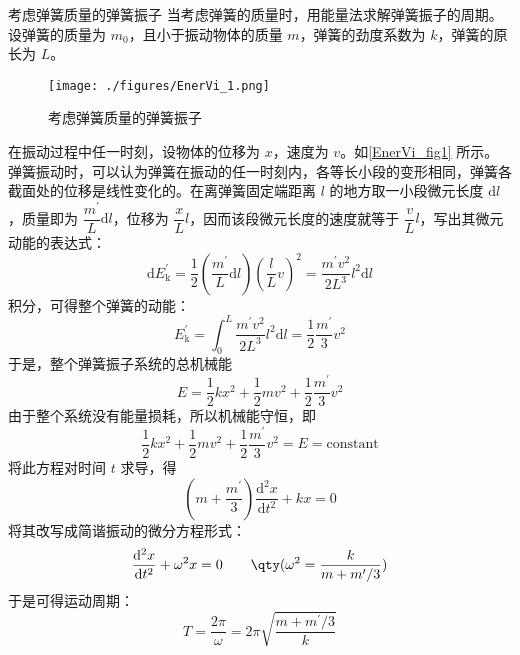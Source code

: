\begin{example}{考虑弹簧质量的弹簧振子}
当考虑弹簧的质量时，用能量法求解弹簧振子的周期。设弹簧的质量为 $m_0$，且小于振动物体的质量 $m$，弹簧的劲度系数为 $k$，弹簧的原长为 $L$。

\begin{figure}[ht]
\centering
\texttt{[image: ./figures/EnerVi\_1.png]}
\caption{考虑弹簧质量的弹簧振子} \label{EnerVi_fig1}
\end{figure}

在振动过程中任一时刻，设物体的位移为 $x $，速度为 $v$。如\autoref{EnerVi_fig1} 所示。弹簧振动时，可以认为弹簧在振动的任一时刻内，各等长小段的变形相同，弹簧各截面处的位移是线性变化的。在离弹簧固定端距离 $l$ 的地方取一小段微元长度 $\mathrm dl$，质量即为 $\dfrac{m^\prime}{L}\mathrm{d}l$，位移为 $\dfrac{x}{L}l$，因而该段微元长度的速度就等于 $\dfrac{v}{L}l$，写出其微元动能的表达式：
\begin{equation}
\mathrm{d} E_{\mathrm{k}}^{\prime}=\frac{1}{2}\left(\frac{m^{\prime}}{L} \mathrm{d} l\right)\left(\frac{l}{L} v\right)^{2}=\frac{m^{\prime} v^{2}}{2 L^{3}} l^{2} \mathrm{d} l
\end{equation}
积分，可得整个弹簧的动能：
\begin{equation}
E_{\mathrm{k}}^{\prime}=\int_{0}^{L} \frac{m^{\prime} v^{2}}{2 L^{3}} l^{2} \mathrm{d} l=\frac{1}{2} \frac{m^{\prime}}{3} v^{2}
\end{equation}
于是，整个弹簧振子系统的总机械能
\begin{equation}
E=\frac{1}{2} k x^{2}+\frac{1}{2} m v^{2}+\frac{1}{2} \frac{m^{\prime}}{3} v^{2}
\end{equation}
由于整个系统没有能量损耗，所以机械能守恒，即
\begin{equation}
\frac{1}{2} k x^{2}+\frac{1}{2} m v^{2}+\frac{1}{2} \frac{m^{\prime}}{3} v^{2}=E=\mathrm{constant}
\end{equation}
将此方程对时间 $t $ 求导，得
\begin{equation}
\left(m+\frac{m^{\prime}}{3}\right) \frac{\mathrm{d}^{2} x}{\mathrm{d} t^{2}}+k x=0
\end{equation}
将其改写成简谐振动的微分方程形式：
\begin{equation}
\frac{\mathrm{d}^{2} x}{\mathrm{d} t^{2}}+\omega^{2} x=0 \qquad \qty(\omega^{2}=\frac{k}{m+m^{\prime} / 3})
\end{equation}
于是可得运动周期：
\begin{equation}
T=\frac{2 \pi}{\omega}=2 \pi \sqrt{\frac{m+m^{\prime} / 3}{k}}
\end{equation}

\end{example}
